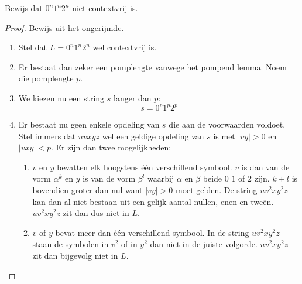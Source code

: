 \documentclass[main.tex]{subfiles}
\begin{document}
\begin{vb}
  Bewijs dat $0^{n}1^{n}2^{n}$ \underline{niet} contextvrij is.
  \begin{proof}
    Bewijs uit het ongerijmde.
    \begin{enumerate}
    \item Stel dat $L = 0^{n}1^{n}2^{n}$ wel contextvrij is.
    \item Er bestaat dan zeker een pomplengte vanwege het pompend lemma.
      Noem die pomplengte $p$.
    \item We kiezen nu een string $s$ langer dan $p$:
      \[ s = 0^{p}1^{p}2^{p} \]
    \item Er bestaat nu geen enkele opdeling van $s$ die aan de voorwaarden voldoet.
      Stel immers dat $uvxyz$ wel een geldige opdeling van $s$ is met $|vy| > 0$ en $|vxy| < p$.
      Er zijn dan twee mogelijkheden:
      \begin{enumerate}
      \item $v$ en $y$ bevatten elk hoogstens \'e\'en verschillend symbool.
        $v$ is dan van de vorm $\alpha^{k}$ en $y$ is van de vorm $\beta^{l}$ waarbij $\alpha$ en $\beta$ beide $0$ $1$ of $2$ zijn. 
        $k+l$ is bovendien groter dan nul want $|vy| > 0$ moet gelden.
        De string $uv^{2}xy^{2}z$ kan dan al niet bestaan uit een gelijk aantal nullen, enen en twe\"en.
        $uv^{2}xy^{2}z$ zit dan dus niet in $L$.
      \item $v$ of $y$ bevat meer dan \'e\'en verschillend symbool.
        In de string $uv^{2}xy^{2}z$ staan de symbolen in $v^{2}$ of in $y^{2}$ dan niet in de juiste volgorde.
        $uv^{2}xy^{2}z$ zit dan bijgevolg niet in $L$.
      \end{enumerate}
    \end{enumerate}
  \end{proof}
\end{vb}







\end{document}
